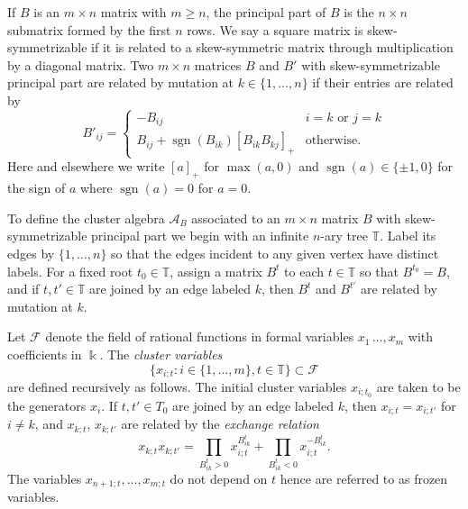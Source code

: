 \documentclass[12pt]{amsart}
\newcommand{\sayHW}[1]{\say[HW]{\color{violet}{\bf HW:}\;#1}}
\newcommand{\sayDR}[1]{\say[DR]{\color{red}{\bf DR:}\;#1}}
\newcommand{\cA}{\mathcal{A}}
\newcommand{\TT}{\mathbb{T}}
\newcommand{\kk}{\Bbbk}%
\newcommand{\cF}{\mathcal{F}}
\newcommand{\sgn}{\operatorname{sgn}}
\theoremstyle{remark}
\numberwithin{equation}{section}
\begin{document}
If $B$ is an $m \times n$ matrix with $m \geq n$, the principal part of $B$ is the $n \times n$ submatrix formed by the first $n$ rows. 
We say a square matrix is skew-symmetrizable if it is related to a skew-symmetric matrix through multiplication by a diagonal matrix. 
Two $m \times n$ matrices $B$ and $B'$ with skew-symmetrizable principal part are related by mutation at $k \in \{1,\dotsc,n\}$ if their entries are related by  
\begin{equation}\label{eq:matrix mutation}
  B'_{ij} = \begin{cases}
  -B_{ij} & i = k \text{ or } j = k\\
  B_{ij} + \sgn(B_{ik})[B_{ik}B_{kj}]_+ & \text{otherwise.}
  \end{cases}
\end{equation}
Here and elsewhere we write $[a]_+$ for $\max(a,0)$ and $\sgn(a) \in \{\pm 1,0\}$ for the sign of $a$ where $\sgn(a)=0$ for $a=0$. %

To define the cluster algebra $\cA_B$ associated to an $m \times n$ matrix $B$ with skew-symmetrizable principal part we begin with an infinite $n$-ary tree  $\TT$. 
Label its edges by $\{1,\dotsc,n\}$ so that the edges incident to any given vertex have distinct labels. 
For a fixed root $t_0 \in\TT$, assign a matrix $B^t$ to each $t \in\TT$ so that $B^{t_0} = B$, and if $t, t' \in\TT$ are joined by an edge labeled $k$, then $B^t$ and $B^{t'}$ are related by mutation at $k$. 

Let $\cF$ denote the field of rational functions in formal variables $x_{1}\,\dotsc,x_{m}$ with coefficients in $\kk$. 
The \emph{cluster variables} $$\{ x_{i;t}: i \in \{1,\dotsc,m\}, t \in\TT\} \subset \cF$$ are defined recursively as follows. The initial cluster variables $x_{i;t_0}$ are taken to be the generators $x_i$. If $t,t' \in T_0$ are joined by an edge labeled $k$, then $x_{i;t} = x_{i;t'}$ for $i \neq k$, and $x_{k;t}$, $x_{k;t'}$ are related by the \emph{exchange relation} 
\[
x_{k;t}x_{k;t'} = \prod_{B^t_{ik}>0}x_{i;t}^{B^t_{ik}} + \prod_{B^t_{ik}<0}x_{i;t}^{-B^t_{ik}}.
\]
The variables $x_{n+1;t},\dotsc, x_{m;t}$ do not depend on $t$ hence are referred to as frozen variables. 
\end{document}
